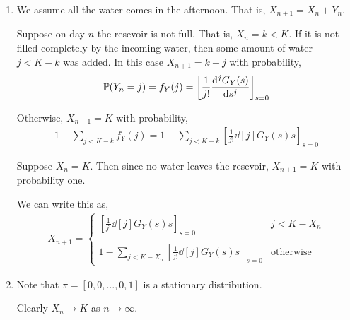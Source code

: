\begin{solution}[Solution]
\begin{enumerate}[label=(\alph*)]
    \item 
        We assume all the water comes in the afternoon. That is, \( X_{n+1} = X_n + Y_n \).

        Suppose on day \( n \) the resevoir is not full. That is, \( X_n = k < K \). If it is not filled completely by the incoming water, then some amount of water \( j < K-k \) was added. In this case \( X_{n+1} = k+j \) with probability,
        \begin{align*}
            \PP(Y_n = j) = f_Y(j) = 
            \left[\frac{1}{j!}\dd[j]{G_Y(s)}{s} \right]_{s=0}
        \end{align*}
        
        Otherwise, \( X_{n+1} = K \) with probability,
        \begin{align*}
            1-\sum_{j < K-k} f_Y(j) = 1 - \sum_{j<K-k} \left[\frac{1}{j!} \dd[j]{G_Y(s)}{s} \right]_{s=0}
        \end{align*}
        
        Suppose \( X_n = K \). Then since no water leaves the resevoir, \( X_{n+1} = K \) with probability one.

        We can write this as,
        \begin{align*}
            X_{n+1} = \begin{cases}
                \left[\frac{1}{j!}\dd[j]{G_Y(s)}{s} \right]_{s=0} & j < K - X_n \\ \\
                1 - \sum_{j<K-X_n} \left[\frac{1}{j!}\dd[j]{G_Y(s)}{s} \right]_{s=0} & \text{otherwise}
            \end{cases}
        \end{align*}
        
    \item
        Note that \( \pi = [0,0,\ldots,0,1] \) is a stationary distribution.



        Clearly \( X_n \to K \) as \( n\to\infty \).

        
\end{enumerate}
\end{solution}

